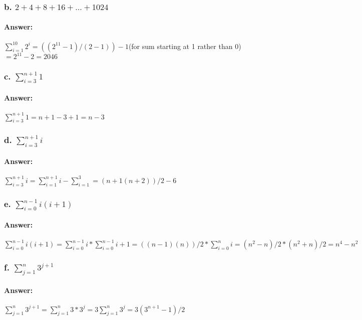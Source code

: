 \documentclass{article}
\begin{document}
  \subsubsection{b. $2 + 4 + 8 + 16 + . . . + 1024$}
    \paragraph{Answer:}
      $\sum\limits_{i=1}^{10}2^i = ((2^{11} - 1)/(2-1)) -1$(for sum starting at 1 rather than 0)$ = 2^{11} -2 = 2046$
  \subsubsection{c. $\sum\limits_{i=3}^{n+1}1$}
    \paragraph{Answer:}
      $\sum\limits_{i=3}^{n+1}1 = n+1 -3 + 1 = n-3$
  \subsubsection{d. $\sum\limits_{i=3}^{n+1}i$}
    \paragraph{Answer: \newline}
      $\sum\limits_{i=3}^{n+1}i = \sum\limits_{i=1}^{n+1}i - \sum\limits_{i=1}^{3} =
      (n+1(n+2))/2 - 6$
  \subsubsection{e. $\sum\limits_{i=0}^{n-1} i(i+1)$}
    \paragraph{Answer: \newline}
      $\sum\limits_{i=0}^{n-1} i(i+1) = \sum\limits_{i=0}^{n-1}i * \sum\limits_{i=0}^{n-1}i+1
      = ((n-1)(n))/2 * \sum\limits_{i=0}^{n}i = (n^2 -n)/2 * (n^2+n)/2 = n^4 - n^2$
  \subsubsection{f. $\sum\limits_{j=1}^{n}3^{j+1}$}
    \paragraph{Answer: \newline}
      $\sum\limits_{j=1}^{n}3^{j+1} = \sum\limits_{j=1}^{n}3*3^{j} = 3\sum\limits_{j=1}^{n}3^{j} =
      3(3^{n+1} -1)/2$
\end{document}
